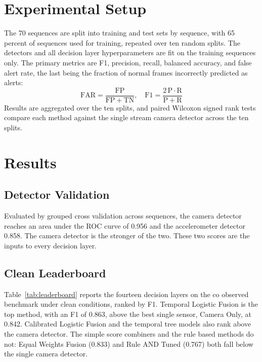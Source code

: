 \documentclass[conference]{IEEEtran}
\begin{document}
\section{Experimental Setup}
The 70 sequences are split into training and test sets by sequence, with 65
percent of sequences used for training, repeated over ten random splits. The
detectors and all decision layer hyperparameters are fit on the training
sequences only. The primary metrics are F1, precision, recall, balanced
accuracy, and false alert rate, the last being the fraction of normal frames
incorrectly predicted as alerts:
\begin{equation}
\mathrm{FAR} = \frac{\mathrm{FP}}{\mathrm{FP} + \mathrm{TN}}, \quad
\mathrm{F1} = \frac{2\,\mathrm{P}\cdot\mathrm{R}}{\mathrm{P} + \mathrm{R}}
\end{equation}
Results are aggregated over the ten splits, and paired Wilcoxon signed rank tests
compare each method against the single stream camera detector across the ten
splits.

\section{Results}
\subsection{Detector Validation}
Evaluated by grouped cross validation across sequences, the camera detector
reaches an area under the ROC curve of 0.956 and the accelerometer detector
0.858. The camera detector is the stronger of the two. These two scores are the
inputs to every decision layer.

\subsection{Clean Leaderboard}
Table~\ref{tab:leaderboard} reports the fourteen decision layers on the co
observed benchmark under clean conditions, ranked by F1. Temporal Logistic Fusion
is the top method, with an F1 of 0.863, above the best single sensor, Camera
Only, at 0.842. Calibrated Logistic Fusion and the temporal tree models also rank
above the camera detector. The simple score combiners and the rule based methods
do not: Equal Weights Fusion (0.833) and Rule AND Tuned (0.767) both fall below
the single camera detector.
\end{document}
